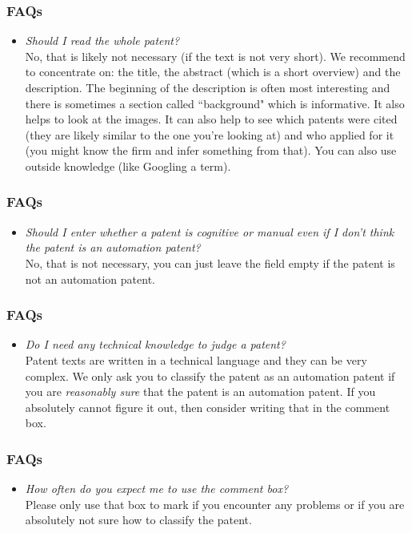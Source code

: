 \documentclass[10pt]{beamer}
\begin{document}
\begin{frame}\frametitle{FAQs}
	\begin{itemize}	
	\item \textit{Should I read the whole patent?}\\[0.1cm]
	No, that is likely not necessary (if the text is not very short). We recommend to concentrate on: the title, the abstract (which is a short overview) and the description. The beginning of the description is often most interesting and there is sometimes a section called ``background" which is informative. It also helps to look at the images. It can also help to see which patents were cited (they are likely similar to the one you're looking at) and who applied for it (you might know the firm and infer something from that). You can also use outside knowledge (like Googling a term). 
	\end{itemize}
\end{frame}	


\begin{frame}\frametitle{FAQs}
	\begin{itemize}	
	\item \textit{Should I enter whether a patent is cognitive or manual even if I don't think the patent is an automation patent?}\\[0.1cm]
	No, that is not necessary, you can just leave the field empty if the patent is not an automation patent.
	\end{itemize}
\end{frame}	


\begin{frame}\frametitle{FAQs}
	\begin{itemize}	
	\item \textit{Do I need any technical knowledge to judge a patent?}\\[0.1cm]
	Patent texts are written in a technical language and they can be very complex. We only ask you to classify the patent as an automation patent if you are \textit{reasonably sure} that the patent is an automation patent. If you absolutely cannot figure it out, then consider writing that in the comment box.
	\end{itemize}
\end{frame}

	
\begin{frame}\frametitle{FAQs}
	\begin{itemize}	
	\item \textit{How often do you expect me to use the comment box?}\\[0.1cm]
	Please only use that box to mark if you encounter any problems or if you are absolutely not sure how to classify the patent.
	\end{itemize}
\end{frame}	
\end{document}
